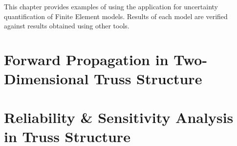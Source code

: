 This chapter provides examples of using the \texttt{\getsoftwarename{}} application for uncertainty
quantification of Finite Element models. Results of each model are verified against results
obtained using other tools. 
\\

\section{Forward Propagation in Two-Dimensional Truss Structure}


\section{Reliability \& Sensitivity Analysis in Truss Structure}


